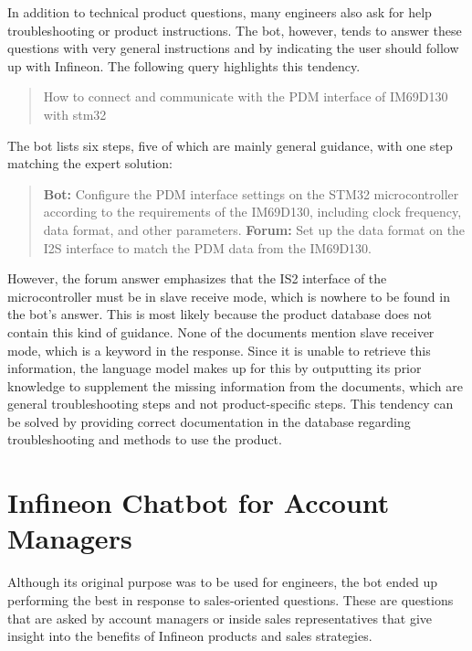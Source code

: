 \documentclass{article}
\begin{document}
In addition to technical product questions, many engineers also ask for help troubleshooting or product instructions. The bot, however, tends to answer these questions with very general instructions and by indicating the user should follow up with Infineon. The following query highlights this tendency.

\begin{quote} How to connect and communicate with the PDM interface of IM69D130 with stm32 \end{quote}
The bot lists six steps, five of which are mainly general guidance, with one step matching the expert solution:
\begin{quote} \textbf{Bot:} Configure the PDM interface settings on the STM32 microcontroller according to the requirements of the IM69D130, including clock frequency, data format, and other parameters. \newline
\textbf{Forum:} Set up the data format on the I2S interface to match the PDM data from the IM69D130. \end{quote}
However, the forum answer emphasizes that the IS2 interface of the microcontroller must be in slave receive mode, which is nowhere to be found in the bot's answer. This is most likely because the product database does not contain this kind of guidance. None of the documents mention slave receiver mode, which is a keyword in the response. Since it is unable to retrieve this information, the language model makes up for this by outputting its prior knowledge to supplement the missing information from the documents, which are general troubleshooting steps and not product-specific steps. This tendency can be solved by providing correct documentation in the database regarding troubleshooting and methods to use the product.

\section*{Infineon Chatbot for Account Managers}
Although its original purpose was to be used for engineers, the bot ended up performing the best in response to sales-oriented questions. These are questions that are asked by account managers or inside sales representatives that give insight into the benefits of Infineon products and sales strategies.
\end{document}
